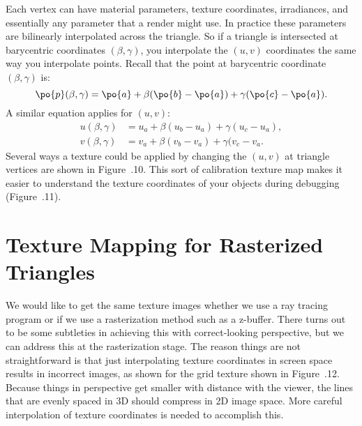 
Each vertex can have material parameters, texture coordinates, irradiances,
and essentially any parameter that a render might use.  In practice
these parameters are bilinearly interpolated across the triangle.
So if a triangle is intersected at barycentric coordinates $(\beta,\gamma)$,
you interpolate the $(u,v)$ coordinates the same way you interpolate points.
Recall that the point at barycentric coordinate $(\beta,\gamma)$ is:
\begin{displaymath}
\po{p}(\beta,\gamma) = \po{a} + \beta(\po{b}-\po{a}) +
                                       \gamma(\po{c}-\po{a}).
\end{displaymath}
A similar equation applies for $(u,v)$:
\begin{displaymath}
\begin{split}
u(\beta,\gamma) & = u_a + \beta(u_b-u_a) + \gamma(u_c-u_a), \\
v(\beta,\gamma) & =  v_a + \beta(v_b-v_a) + \gamma(v_c-v_a.
\end{split}
\end{displaymath}
Several ways a texture could be applied by changing the $(u,v)$ at 
triangle vertices are shown in Figure~\thechapter.10.  This sort of
calibration texture map makes it easier to understand the 
texture coordinates of your objects during
debugging (Figure~\thechapter.11).






\section{Texture Mapping for Rasterized Triangles}\label{sec:texras}

We would like to get the same texture images whether we use
a ray tracing program or if we use a rasterization method
such as a z-buffer.  There turns out to be some subtleties in
achieving this with correct-looking perspective, but we can
address this at the rasterization stage.  The reason things
are not straightforward is that just interpolating texture
coordinates in screen space results in incorrect images,
as shown for the grid texture shown in  Figure~\thechapter.12.
Because things in perspective get smaller with distance with
the viewer, the lines that are evenly spaced in 3D should
compress in 2D image space.  More careful interpolation
of texture coordinates is needed to accomplish this.

